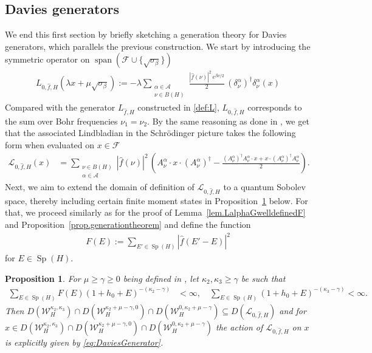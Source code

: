 \documentclass[11pt]{amsart}
\newcommand{\1}{\mathbbm{1}}
\newcommand{\spec}{\operatorname{Sp}}
\theoremstyle{plain}
\newtheorem{proposition}[theorem]{Proposition}
\theoremstyle{definition}
\theoremstyle{remark}
\numberwithin{equation}{section}
\begin{document}
\subsection{Davies generators}\label{sec:Davies}

\noindent We end this first section by briefly sketching a generation theory for Davies generators, which parallels the previous construction. We start by introducing the symmetric operator on $\operatorname{span}(\mathscr{F}\cup \{\sqrt{\sigma_{\beta}}\})$
\begin{align}
L_{0,\widehat{f},H}(\lambda x+\mu\sqrt{\sigma_\beta})\!:=-\lambda \sum_{\substack{\alpha\in\mathcal{A}\\ \nu\in B(H)}}\frac{|\widehat{f}(\nu)|^2\,e^{\beta\nu/2}}{2}\,(\delta^\alpha_{\nu})^{\dagger}\delta^\alpha_{\nu}(x)
\end{align}
Compared with the generator $L_{\widehat{f},H}$ constructed in \eqref{def:L}, $L_{0,\widehat{f},H}$ corresponds to the sum over Bohr frequencies $\nu_1=\nu_2$. By the same reasoning as done in , we get that the associated Lindbladian in the Schr\"{o}dinger picture takes the following form when evaluated on $x\in\mathscr{F}$
\begin{align}
\label{eq:DaviesGenerator}
    \mathcal{L}_{0,\widehat{f},H}(x)&=\sum_{\substack{\nu\in B(H)\\\alpha\in\mathcal{A}}}{|\widehat{f}(\nu)|^2}\,\left(A^\alpha_{\nu} \cdot x\cdot (A^\alpha_{\nu})^\dagger-\frac{(A^\alpha_{\nu})^\dagger A^\alpha_{\nu}\cdot x+x\cdot (A^\alpha_{\nu})^\dagger A^\alpha_{\nu}}{2}\right).
\end{align}
Next, we aim to extend the domain of definition of $\mathcal{L}_{0,\widehat{f},H}$ to a quantum Sobolev space, thereby including certain finite moment states in Proposition~\ref{prop:DaviesFiniteMoment} below. For that, we proceed similarly as for the proof of Lemma~\ref{lem.LalphaGwelldefinedF} and Proposition~\ref{prop.generationtheorem} and define the function
\begin{align}\label{def:F3E}
F(E):=\sum_{E'\in\spec(H)}|\widehat f(E'-E)|^2
\end{align}
for $E\in\spec(H).$
\begin{proposition}
\label{prop:DaviesFiniteMoment}
    For $\mu\ge\gamma\ge 0$ being defined in , let $\kappa_2,\kappa_3\ge\gamma$ be such that
    \begin{align}
    \sum_{E\in \spec(H)} F(E)(1+h_0+E)^{-(\kappa_2-\gamma)} &<\infty,\quad \sum_{E\in \spec(H)} (1+h_0+E)^{-(\kappa_3-\gamma)} <\infty.
\end{align}
Then $D(\mathcal{W}_H^{\kappa_2,\kappa_3})\cap D(\mathcal{W}_H^{\kappa_2+\mu-\gamma,0})\cap D(\mathcal{W}_H^{0,\kappa_2+\mu-\gamma})\subseteq D(\mathcal{L}_{0,\widehat{f},H})$ and for $x\in D(\mathcal{W}_H^{\kappa_2,\kappa_3})\cap D(\mathcal{W}_H^{\kappa_2+\mu-\gamma,0})\cap D(\mathcal{W}_H^{0,\kappa_2+\mu-\gamma})$ the action of $\mathcal{L}_{0,\widehat{f},H}$ on $x$ is explicitly given by \eqref{eq:DaviesGenerator}.

\end{proposition}
\end{document}
